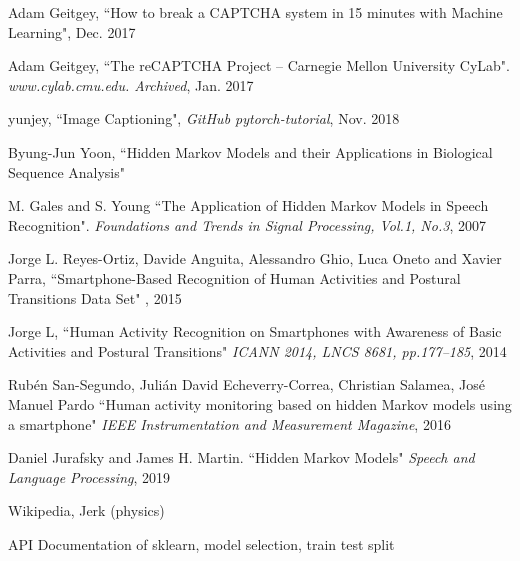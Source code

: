 \documentclass[10pt,letterpaper]{article}
\begin{document}
\begin{thebibliography}{9}

Adam Geitgey, ``How to break a CAPTCHA system in 15 minutes with Machine Learning", Dec. 2017

Adam Geitgey, ``The reCAPTCHA Project – Carnegie Mellon University CyLab". {\textit{www.cylab.cmu.edu. Archived}}, Jan. 2017

yunjey, ``Image Captioning", {\textit{GitHub pytorch-tutorial}}, Nov. 2018

Byung-Jun Yoon, 
``Hidden Markov Models and their Applications in Biological Sequence Analysis"

M. Gales and S. Young
``The Application of Hidden Markov Models in Speech Recognition".
{\textit{Foundations and Trends in Signal Processing, Vol.1, No.3}, 2007}

Jorge L. Reyes-Ortiz, Davide Anguita, Alessandro Ghio, Luca Oneto and Xavier Parra,
``Smartphone-Based Recognition of Human Activities and Postural Transitions Data Set"
, 2015

Jorge L, \etal
``Human Activity Recognition on Smartphones with Awareness of Basic Activities and Postural Transitions"
{\textit{ICANN 2014, LNCS 8681, pp.177–185}, 2014}

Rubén San-Segundo, Julián David Echeverry-Correa, Christian Salamea, José Manuel Pardo
``Human activity monitoring based on hidden Markov models using a smartphone"
{\textit{IEEE Instrumentation and Measurement Magazine}, 2016}

Daniel Jurafsky and James H. Martin.
``Hidden Markov Models"
{\textit{Speech and Language Processing}, 2019}

Wikipedia, Jerk (physics)

API Documentation of sklearn, model selection, train test split


\end{thebibliography}
\end{document}
